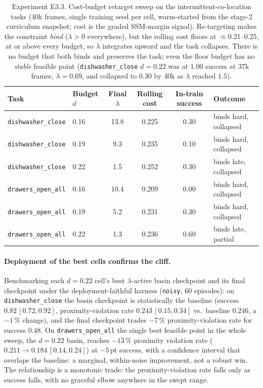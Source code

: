 \documentclass[11pt,a4paper]{report}
\newcommand{\ssm}{SSM}
\begin{document}
\begin{table}[htbp]
\centering
\small
\caption{Experiment E3.3. Cost-budget retarget sweep on the
intermittent-co-location tasks (40k frames, single training seed per
cell, warm-started from the stage-2 curriculum snapshot; cost is the
graded \ssm{}-margin signal). Re-targeting makes the constraint
\emph{bind} ($\lambda > 0$ everywhere), but the rolling cost floors
at $\approx$0.21--0.25, at or above every budget, so $\lambda$
integrates upward and the task collapses. There is no budget that
both binds and preserves the task; even the floor budget has no
\emph{stable} feasible point (\texttt{dishwasher\_close} $d{=}0.22$ was at $1.00$
success at 37k frames, $\lambda = 0.69$, and collapsed to $0.30$ by
40k as $\lambda$ reached $1.5$).}
\label{tab:e3.3-budget-sweep}
\begin{tabular}{llcccl}
\toprule
Task & Budget $d$ & Final $\lambda$ & Rolling cost & In-train success & Outcome \\
\midrule
\texttt{dishwasher\_close} & 0.16 & 13.8 & 0.225 & 0.30 & binds hard, collapsed \\
\texttt{dishwasher\_close} & 0.19 & 9.3  & 0.235 & 0.10 & binds hard, collapsed \\
\texttt{dishwasher\_close} & 0.22 & 1.5  & 0.252 & 0.30 & binds late, collapsed \\
\texttt{drawers\_open\_all} & 0.16 & 10.4 & 0.209 & 0.00 & binds hard, collapsed \\
\texttt{drawers\_open\_all} & 0.19 & 5.2  & 0.231 & 0.30 & binds hard, collapsed \\
\texttt{drawers\_open\_all} & 0.22 & 1.3  & 0.236 & 0.60 & binds late, partial \\
\bottomrule
\end{tabular}
\end{table}

\paragraph{Deployment of the best cells confirms the cliff.}
Benchmarking each $d = 0.22$ cell's best $\lambda$-active basin
checkpoint and its final checkpoint under the deployment-faithful
harness (\texttt{noisy}, 60 episodes): on \texttt{dishwasher\_close} the basin
checkpoint is statistically the baseline (success $0.82\,[0.72,
0.92]$, proximity-violation rate $0.243\,[0.15, 0.34]$ vs.\ baseline $0.246$, a
$-1\,\%$ change), and the final checkpoint trades $-7\,\%$ proximity-violation rate
for success $0.48$. On \texttt{drawers\_open\_all} the single best feasible point in the
whole sweep, the $d = 0.22$ basin, reaches $-13\,\%$ proximity
violation rate ($0.211 \to 0.184\,[0.14, 0.24]$) at $-5$\,pt success, with a confidence interval that
overlaps the baseline: a marginal, within-noise improvement, not a
robust win. The relationship is a monotonic trade: the proximity-violation rate falls
only as success falls, with no graceful elbow anywhere in the swept
range.
\end{document}
